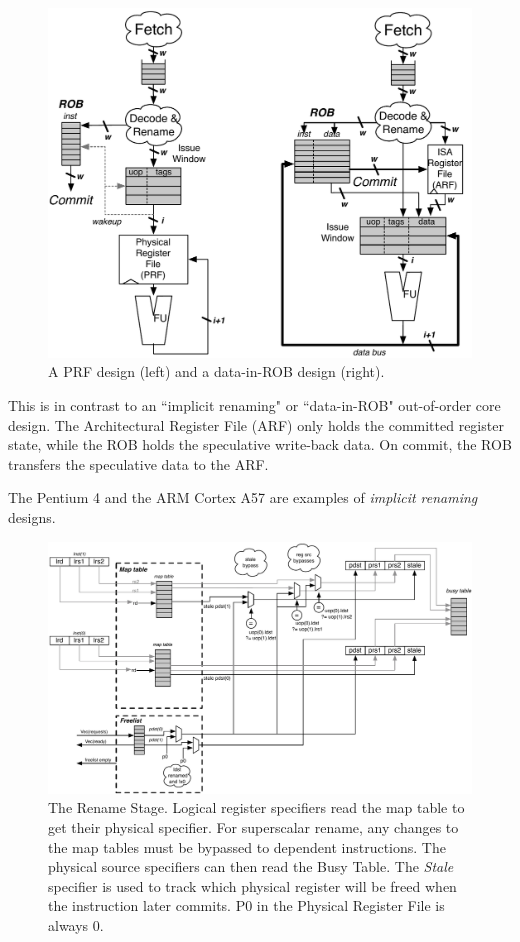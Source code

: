 \begin{figure}[htb]
	\centering
	\centerline{\includegraphics[scale =0.8] {figures/prf-and-arf}}
	\caption{ \small A PRF design (left) and a data-in-ROB design (right).}
	\label{fig:prf_design}
\end{figure}


This is in contrast to an ``implicit renaming" or ``data-in-ROB" out-of-order core design.  The Architectural Register File (ARF) only holds the committed register state, while the ROB holds the speculative write-back data.  On commit, the ROB transfers the speculative data to the ARF. 

The Pentium 4 and the ARM Cortex A57 are examples of {\em implicit renaming} designs.




\begin{figure}[htb]
	\centering
	\centerline{\includegraphics[scale =0.6] {figures/rename-pipeline}}
	\caption{ \small The Rename Stage. Logical register specifiers read the map table to get their physical specifier. For superscalar rename, any changes to the map tables must be bypassed to dependent instructions. The physical source specifiers can then read the Busy Table. The {\em Stale} specifier is used to track which physical register will be freed when the instruction later commits. P0 in the Physical Register File is always 0.}
	\label{fig:rename-pipeline}
\end{figure}


